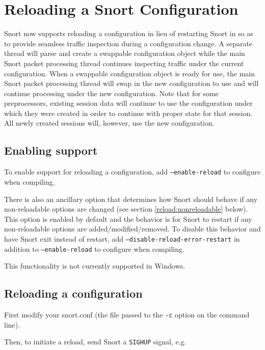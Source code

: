 \documentclass[english]{report}
\newenvironment{note}{
\samepage
    \vspace{10pt}{\textsf{
        {\hspace{7pt}\Huge{$\triangle$\hspace{-12.5pt}{\Large{$^!$}}}}\hspace{5pt}
        {\Large{NOTE}}
    }
    }
   \begin{center}
    \par\vspace{-17pt}

    \begin{lrbox}{\savepar}
    \begin{minipage}[r]{6in}
}
{
    \end{minipage}
    \end{lrbox}
    \fbox{
        \usebox{
            \savepar
	}
    }
    \par\vskip10pt
    \end{center}
}
\newenvironment{note}{
        \begin{rawhtml}
        <p><table border="1"><tr><td><b>
        Note:&nbsp;&nbsp;</b>
        \end{rawhtml}
}{
        \begin{rawhtml}
        </b></td></tr></table></p>
        \end{rawhtml}
}
\begin{document}
\section{Reloading a Snort Configuration}

Snort now supports reloading a configuration in lieu of restarting Snort in
so as to provide seamless traffic inspection during a configuration change.
A separate thread will parse and create a swappable configuration object while
the main Snort packet processing thread continues inspecting traffic under the
current configuration.  When a swappable configuration object is ready for use,
the main Snort packet processing thread will swap in the new configuration to
use and will continue processing under the new configuration.  Note that for
some preprocessors, existing session data will continue to use the configuration
under which they were created in order to continue with proper state for that
session.  All newly created sessions will, however, use the new configuration.


\subsection{Enabling support}
\label{reload:enable}
To enable support for reloading a configuration, add \texttt{--enable-reload} to
configure when compiling.

There is also an ancillary option that determines how Snort should behave
if any non-reloadable options are changed (see section \ref{reload:nonreloadable} below).
This option is enabled by default and the behavior is for
Snort to restart if any non-reloadable options are added/modified/removed.
To disable this behavior and have Snort exit instead of restart, add
\texttt{--disable-reload-error-restart} in addition to \texttt{--enable-reload} to configure
when compiling.

\begin{note}
This functionality is not currently supported in Windows.
\end{note}


\subsection{Reloading a configuration}
\label{reload:reload}
First modify your snort.conf (the file passed to the \texttt{-c} option on the
command line).

Then, to initiate a reload, send Snort a \texttt{SIGHUP} signal, e.g.
\end{document}
